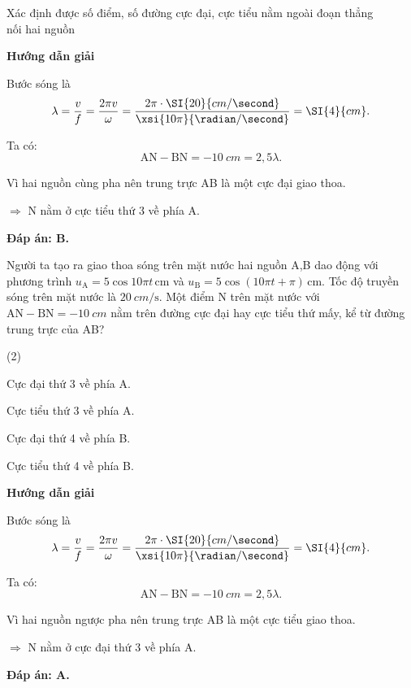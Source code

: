 \begin{dang}{Xác định được số điểm, số đường cực đại, cực tiểu nằm ngoài đoạn thẳng\\ nối hai nguồn}
	{
		\begin{center}
			\textbf{Hướng dẫn giải}
		\end{center}
		
		Bước sóng là
		$$\lambda=\dfrac{v}{f}=\dfrac{2\pi v}{\omega}=\dfrac{2\pi \cdot\SI{20}{cm/\second}}{\xsi{10\pi}{\radian/\second}}=\SI{4}{cm}.$$ 
		
		Ta có: $$\text{AN}-\text{BN}=-\SI{10}{cm}=2,5\lambda.$$
		
		Vì hai nguồn cùng pha nên trung trực AB là một cực đại giao thoa.
		
		$\Rightarrow$ N nằm ở cực tiểu thứ 3 về phía A.
		
		\textbf{Đáp án: B.}
	}
	
	{
		Người ta tạo ra giao thoa sóng trên mặt nước hai nguồn A,B dao động với phương trình $u_\text{A}=5\cos10\pi t\, \text{cm}$ và $u_\text{B}=5\cos(10\pi t+\pi)\, \text{cm}$. Tốc độ truyền sóng trên mặt nước là $\SI{20}{cm/\second}$. Một điểm N trên mặt nước với $\text{AN}-\text{BN}=-\SI{10}{cm}$ nằm trên đường cực đại hay cực tiểu thứ mấy, kể từ đường trung trực của AB?
		\begin{mcq}(2)
			\item Cực đại thứ 3 về phía A.
			\item Cực tiểu thứ 3 về phía A.
			\item Cực đại thứ 4 về phía B.
			\item Cực tiểu thứ 4 về phía B.
		\end{mcq}
	}{
		\begin{center}
			\textbf{Hướng dẫn giải}
		\end{center}
		
		Bước sóng là
		$$\lambda=\dfrac{v}{f}=\dfrac{2\pi v}{\omega}=\dfrac{2\pi \cdot\SI{20}{cm/\second}}{\xsi{10\pi}{\radian/\second}}=\SI{4}{cm}.$$ 
		
		Ta có: $$\text{AN}-\text{BN}=-\SI{10}{cm}=2,5\lambda.$$
		
		Vì hai nguồn ngược pha nên trung trực AB là một cực tiểu giao thoa.
		
		$\Rightarrow$ N nằm ở cực đại thứ 3 về phía A.
		
		\textbf{Đáp án: A.}
	}
\end{dang}
